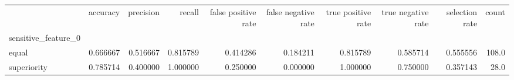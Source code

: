 \begin{tabular}{lrrrrrrrrr}
\toprule
{} &  accuracy &  precision &    recall &  false positive rate &  false negative rate &  true positive rate &  true negative rate &  selection rate &  count \\
sensitive\_feature\_0 &           &            &           &                      &                      &                     &                     &                 &        \\
\midrule
equal               &  0.666667 &   0.516667 &  0.815789 &             0.414286 &             0.184211 &            0.815789 &            0.585714 &        0.555556 &  108.0 \\
superiority         &  0.785714 &   0.400000 &  1.000000 &             0.250000 &             0.000000 &            1.000000 &            0.750000 &        0.357143 &   28.0 \\
\bottomrule
\end{tabular}

